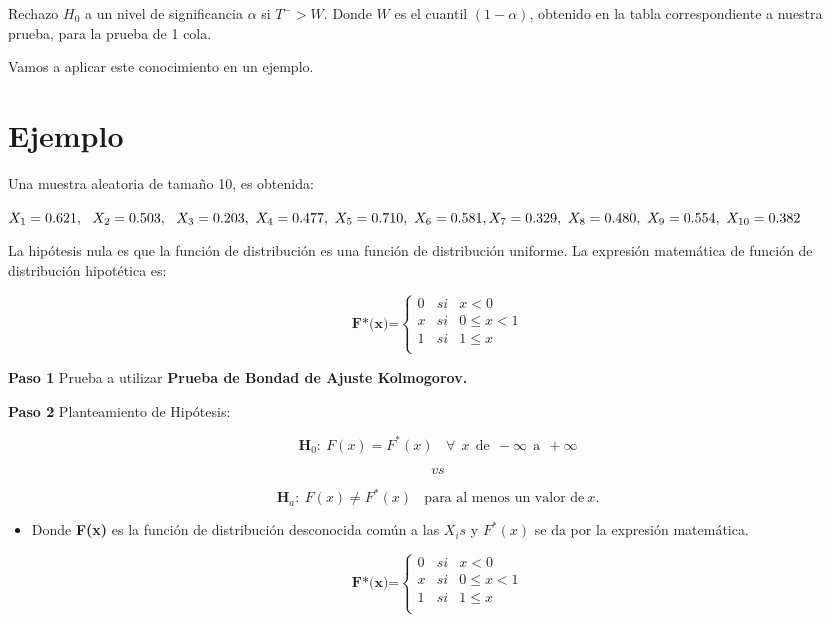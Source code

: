\documentclass[
  a4paper,
  oneside,
  openany]{book}
\providecommand{\tightlist}{%
  \setlength{\itemsep}{0pt}\setlength{\parskip}{0pt}}
\begin{document}
Rechazo \(H_0\) a un nivel de significancia \(\alpha\) si \(T^->W\). Donde \(W\) es el cuantil \((1-\alpha)\), obtenido en la tabla correspondiente a nuestra prueba, para la prueba de 1 cola.

Vamos a aplicar este conocimiento en un ejemplo.

\hypertarget{ejemplo-12}{%
\section{Ejemplo}\label{ejemplo-12}}

Una muestra aleatoria de tamaño 10, es obtenida:

\(X_{1}=0.621,\ \ X_{2}=0.503, \ \ X_{3}=0.203, \ X_{4}=0.477, \ X_{5}=0.710, \ X_{6}=0.581, \\ X_{7}=0.329, \ X_{8}=0.480, \  X_{9}=0.554, \ X_{10}=0.382\)

La hipótesis nula es que la función de distribución es una función de distribución uniforme.
La expresión matemática de función de distribución hipotética es:

\[
\textbf{F*(x)=} \left\{
\begin{array}{lcc}
0 & si & x < 0 \\
x & si & 0 \leq x < 1 \\
1 & si & 1 \leq x \\
\end{array}
\right.
\]

\textbf{Paso 1} Prueba a utilizar \textbf{Prueba de Bondad de Ajuste Kolmogorov.}

\textbf{Paso 2} Planteamiento de Hipótesis:

\[\textbf{H}_0: \ F(x)=F^*(x) \ \ \ \ \forall \ \ x \ \ \mbox{de} \ \ -\infty \ \  \mbox{a} \ \  +\infty\]

\[vs\]

\[\textbf{H}_a: \ F(x) \neq F^*(x) \ \ \ \ \mbox{para al menos un  valor de} \  x.\]

\begin{itemize}
\tightlist
\item
  Donde \textbf{F(x)} es la función de distribución desconocida común a las \(X_{i}s\) y \(F^*(x)\) se da por la expresión matemática.
\end{itemize}

\[
\textbf{F*(x)=} \left\{
\begin{array}{lcc}
0 & si & x < 0 \\
x & si & 0 \leq x < 1 \\
1 & si & 1 \leq x \\
\end{array}
\right.
\]
\end{document}

